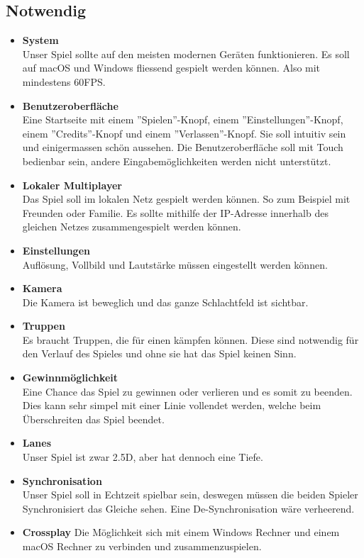 \subsection*{Notwendig}
\begin{itemize}
    \item \textbf{System} \\
        Unser Spiel sollte auf den meisten modernen Geräten funktionieren. Es soll auf macOS und
        Windows fliessend gespielt werden können. Also mit mindestens 60FPS.
    \item \textbf{Benutzeroberfläche} \\
        Eine Startseite mit einem ''Spielen''-Knopf, einem ''Einstellungen''-Knopf, einem
        ''Credits''-Knopf und einem ''Verlassen''-Knopf. Sie soll intuitiv sein und einigermassen
        schön aussehen. Die Benutzeroberfläche soll mit Touch bedienbar sein, andere Eingabemöglichkeiten
        werden nicht unterstützt.
    \item \textbf{Lokaler Multiplayer} \\
        Das Spiel soll im lokalen Netz gespielt werden können. So zum Beispiel mit Freunden oder Familie.
        Es sollte mithilfe der IP-Adresse innerhalb des gleichen Netzes zusammengespielt werden können.
    \item \textbf{Einstellungen} \\
        Auflösung, Vollbild und Lautstärke müssen eingestellt werden können.
    \item \textbf{Kamera} \\
        Die Kamera ist beweglich und das ganze Schlachtfeld ist sichtbar.
    \item \textbf{Truppen} \\
        Es braucht Truppen, die für einen kämpfen können. Diese sind notwendig für den Verlauf des Spieles
        und ohne sie hat das Spiel keinen Sinn.
    \item \textbf{Gewinnmöglichkeit} \\
        Eine Chance das Spiel zu gewinnen oder verlieren und es somit zu beenden. Dies kann sehr simpel
        mit einer Linie vollendet werden, welche beim Überschreiten das Spiel beendet.
    \item \textbf{Lanes} \\
        Unser Spiel ist zwar 2.5D, aber hat dennoch eine Tiefe.
    \item \textbf{Synchronisation} \\
        Unser Spiel soll in Echtzeit spielbar sein, deswegen müssen die beiden Spieler Synchronisiert das Gleiche sehen. Eine De-Synchronisation wäre verheerend. 
    \item \textbf{Crossplay}
        Die Möglichkeit sich mit einem Windows Rechner und einem macOS Rechner zu verbinden und zusammenzuspielen.
\end{itemize}

